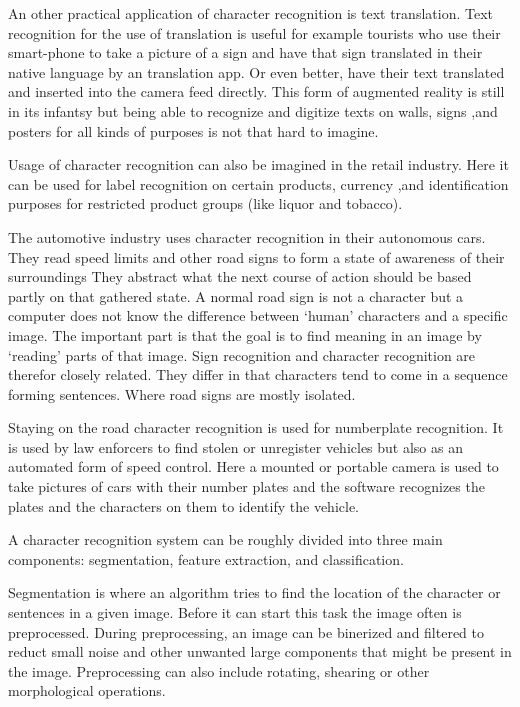 An other practical application of character recognition is text translation. Text recognition for the use of translation is useful for example tourists who use their smart-phone to take a picture of a sign and have that sign translated in their native language by an translation app. Or even better, have their text translated and inserted into the camera feed directly. This form of augmented reality is still in its infantsy but being able to recognize and digitize texts on walls, signs ,and posters for all kinds of purposes is not that hard to imagine. 

Usage of character recognition can also be imagined in the retail industry. Here it can be used for label recognition on certain products, currency ,and identification purposes for restricted product groups (like liquor and tobacco).

The automotive industry uses character recognition in their autonomous cars. They read speed limits and other road signs to form a state of awareness of their surroundings They abstract what the next course of action should be based partly on that gathered state. A normal road sign is not a character but a computer does not know the difference between `human' characters and a specific image. The important part is that the goal is to find meaning in an image by `reading' parts of that image. Sign recognition and character recognition are therefor closely related. They differ in that characters tend to come in a sequence forming sentences. Where road signs are mostly isolated.

Staying on the road character recognition is used for numberplate recognition. It is used by law enforcers to find stolen or unregister vehicles but also as an automated form of speed control. Here a mounted or portable camera is used to take pictures of cars with their number plates and the software recognizes the plates and the characters on them to identify the vehicle. 

A character recognition system can be roughly divided into three main components: segmentation, feature extraction, and classification.

Segmentation is where an algorithm tries to find the location of the character or sentences in a given image. Before it can start this task the image often is preprocessed. During preprocessing, an image can be binerized and filtered to reduct small noise and other unwanted large components that might be present in the image. Preprocessing can also include rotating, shearing or other morphological operations.

